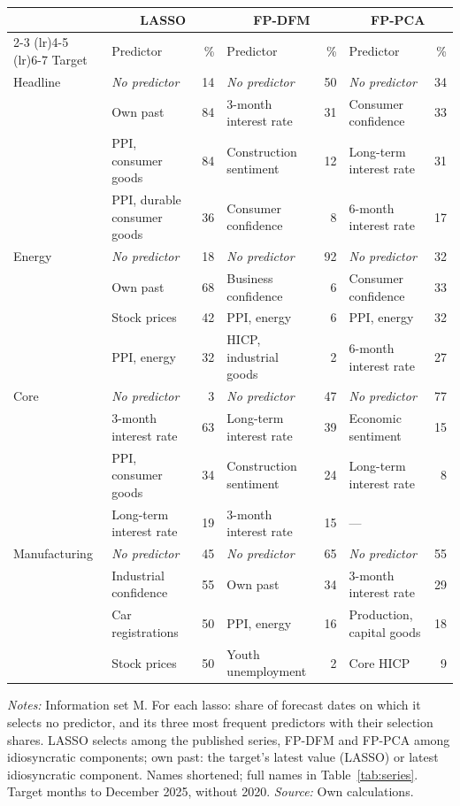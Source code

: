 \begin{threeparttable}
\begin{tabular}{@{}llrlrlr@{}}
\toprule
 & \multicolumn{2}{c}{LASSO} & \multicolumn{2}{c}{FP-DFM} & \multicolumn{2}{c}{FP-PCA} \\
\cmidrule(lr){2-3} \cmidrule(lr){4-5} \cmidrule(lr){6-7}
Target & Predictor & \% & Predictor & \% & Predictor & \% \\
\midrule
Headline & \textit{No predictor} & 14 & \textit{No predictor} & 50 & \textit{No predictor} & 34 \\
 & Own past & 84 & 3-month interest rate & 31 & Consumer confidence & 33 \\
 & PPI, consumer goods & 84 & Construction sentiment & 12 & Long-term interest rate & 31 \\
 & PPI, durable consumer goods & 36 & Consumer confidence & 8 & 6-month interest rate & 17 \\
\midrule
Energy & \textit{No predictor} & 18 & \textit{No predictor} & 92 & \textit{No predictor} & 32 \\
 & Own past & 68 & Business confidence & 6 & Consumer confidence & 33 \\
 & Stock prices & 42 & PPI, energy & 6 & PPI, energy & 32 \\
 & PPI, energy & 32 & HICP, industrial goods & 2 & 6-month interest rate & 27 \\
\midrule
Core & \textit{No predictor} & 3 & \textit{No predictor} & 47 & \textit{No predictor} & 77 \\
 & 3-month interest rate & 63 & Long-term interest rate & 39 & Economic sentiment & 15 \\
 & PPI, consumer goods & 34 & Construction sentiment & 24 & Long-term interest rate & 8 \\
 & Long-term interest rate & 19 & 3-month interest rate & 15 & --- &  \\
\midrule
Manufacturing & \textit{No predictor} & 45 & \textit{No predictor} & 65 & \textit{No predictor} & 55 \\
 & Industrial confidence & 55 & Own past & 34 & 3-month interest rate & 29 \\
 & Car registrations & 50 & PPI, energy & 16 & Production, capital goods & 18 \\
 & Stock prices & 50 & Youth unemployment & 2 & Core HICP & 9 \\
\bottomrule
\end{tabular}
\begin{tablenotes}[flushleft]\footnotesize
\item \textit{Notes:} Information set M. For each lasso: share of forecast dates on which it selects no predictor, and its three most frequent predictors with their selection shares. LASSO selects among the published series, FP-DFM and FP-PCA among idiosyncratic components; own past: the target's latest value (LASSO) or latest idiosyncratic component. Names shortened; full names in Table~\ref{tab:series}. Target months to December 2025, without 2020. \textit{Source:} Own calculations.
\end{tablenotes}
\end{threeparttable}
